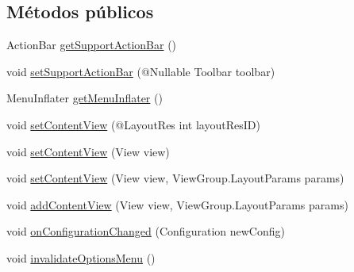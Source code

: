 \subsection*{Métodos públicos}
\begin{DoxyCompactItemize}
\item 
Action\+Bar \mbox{\hyperlink{classcom_1_1loalon_1_1pfg_1_1facepal_1_1_app_compat_preference_activity_afe58ba3051d87d3f3f6293995a31b429}{get\+Support\+Action\+Bar}} ()
\item 
void \mbox{\hyperlink{classcom_1_1loalon_1_1pfg_1_1facepal_1_1_app_compat_preference_activity_aac76dd0bd0fdcd1a027481856c085cd5}{set\+Support\+Action\+Bar}} (@Nullable Toolbar toolbar)
\item 
Menu\+Inflater \mbox{\hyperlink{classcom_1_1loalon_1_1pfg_1_1facepal_1_1_app_compat_preference_activity_af8c10bed11f19e960e5c30e67ba8996e}{get\+Menu\+Inflater}} ()
\item 
void \mbox{\hyperlink{classcom_1_1loalon_1_1pfg_1_1facepal_1_1_app_compat_preference_activity_aaaa2c55c420cd029906a1ec249a2db62}{set\+Content\+View}} (@Layout\+Res int layout\+Res\+ID)
\item 
void \mbox{\hyperlink{classcom_1_1loalon_1_1pfg_1_1facepal_1_1_app_compat_preference_activity_acb8ea15f72b5f052ef347cba2b8ead7a}{set\+Content\+View}} (View view)
\item 
void \mbox{\hyperlink{classcom_1_1loalon_1_1pfg_1_1facepal_1_1_app_compat_preference_activity_ae35d9258f0c07d79e4f8c9f16ac196e8}{set\+Content\+View}} (View view, View\+Group.\+Layout\+Params params)
\item 
void \mbox{\hyperlink{classcom_1_1loalon_1_1pfg_1_1facepal_1_1_app_compat_preference_activity_ac0e4a7ebdb9b70dfc44bf734abcf5039}{add\+Content\+View}} (View view, View\+Group.\+Layout\+Params params)
\item 
void \mbox{\hyperlink{classcom_1_1loalon_1_1pfg_1_1facepal_1_1_app_compat_preference_activity_a4dde4dbc997134f057d91b419beb859a}{on\+Configuration\+Changed}} (Configuration new\+Config)
\item 
void \mbox{\hyperlink{classcom_1_1loalon_1_1pfg_1_1facepal_1_1_app_compat_preference_activity_a330510859637ddbad639accf7ad1d412}{invalidate\+Options\+Menu}} ()
\end{DoxyCompactItemize}
